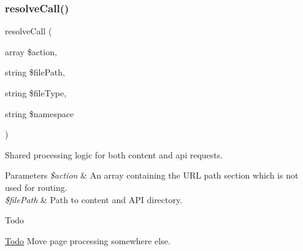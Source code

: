 \subsubsection{\texorpdfstring{resolve\+Call()}{resolveCall()}}
{\footnotesize\ttfamily resolve\+Call (\begin{DoxyParamCaption}\item[{array}]{\$action,  }\item[{string}]{\$file\+Path,  }\item[{string}]{\$file\+Type,  }\item[{string}]{\$namespace }\end{DoxyParamCaption})\hspace{0.3cm}{\ttfamily [private]}}

Shared processing logic for both content and api requests. 
\begin{DoxyParams}{Parameters}
{\em \$action} & An array containing the U\+RL path section which is not used for routing. \\
\hline
{\em \$file\+Path} & Path to content and A\+PI directory. \\
\hline
\end{DoxyParams}
\begin{DoxyRefDesc}{Todo}
\item[\hyperlink{todo__todo000011}{Todo}]Move page processing somewhere else. \end{DoxyRefDesc}


